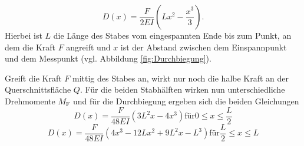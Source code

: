 \begin{equation}
	\label{eqn:d_x_einseitig}
	D(x)=\frac{F}{2EI}\left(Lx^2-\frac{x^3}{3}\right) \text{.}
\end{equation}
Hierbei ist $L$ die Länge des Stabes vom eingespannten Ende bis zum Punkt, an dem die Kraft $F$ angreift und $x$ ist der Abstand zwischen dem Einspannpunkt und dem Messpunkt (vgl. Abbildung \ref{fig:Durchbiegung}).

Greift die Kraft $F$ mittig des Stabes an, wirkt nur noch die halbe Kraft an der Querschnittsfläche $Q$. Für die beiden Stabhälften wirken nun unterschiedliche Drehmomente $M_{\mathrm{F}}$ und für die Durchbiegung ergeben sich die beiden Gleichungen
\begin{equation}
	\label{eqn:d_x_beidseitig_eins}
	D(x)=\frac{F}{48EI}\left(3L^2x-4x^3\right) \mathrm{ für } 0\leq x\leq\frac{L}{2}
\end{equation}
\begin{equation}
	\label{eqn:d_x_beidseitig_zwei}
	D(x)=\frac{F}{48EI}\left(4x^3-12 Lx^2+9 L^2x-L^3\right) \mathrm{ für } \frac{L}{2}\leq x \leq L
\end{equation}
